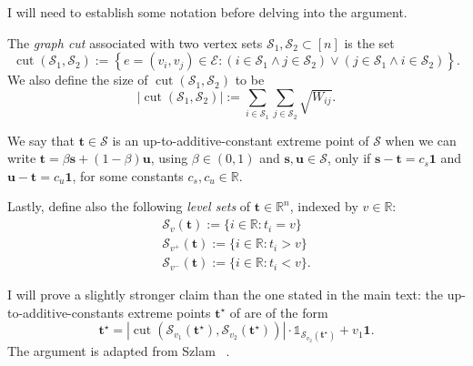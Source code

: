 I will need to establish some notation before delving into the argument.

\begin{definition}
    The \emph{graph cut} associated with two vertex sets $\mathcal{S}_1, \mathcal{S}_2 \subset [n]$ is the set
    \begin{equation}
        \operatorname{cut}\left(\mathcal{S}_1, \mathcal{S}_2\right) := \left\{ e = \left(v_i, v_j\right) \in \mathcal{E} : (i \in \mathcal{S}_1 \wedge j \in \mathcal{S}_2) \vee (j \in \mathcal{S}_1 \wedge i \in \mathcal{S}_2)\right\}.
    \end{equation}
    We also define the size of $\operatorname{cut}\left(\mathcal{S}_1, \mathcal{S}_2\right)$ to be
    \begin{equation}
        \left|\operatorname{cut}\left(\mathcal{S}_1, \mathcal{S}_2\right)\right| := \sum_{i \in \mathcal{S}_1} \sum_{j \in \mathcal{S}_2} \sqrt{W_{ij}}.
    \end{equation}
\end{definition}

\begin{definition}
    We say that $\mathbf{t} \in \mathcal{S}$ is an up-to-additive-constant extreme point of $\mathcal{S}$ when we can write $\mathbf{t} = \beta \mathbf{s} + (1 - \beta) \mathbf{u}$, using $\beta \in (0,1)$ and $\mathbf{s}, \mathbf{u} \in \mathcal{S}$, only if $\mathbf{s} - \mathbf{t} = c_s \mathbf{1}$ and $\mathbf{u} - \mathbf{t} = c_u \mathbf{1}$, for some constants $c_s, c_u \in \mathbb{R}$.
\end{definition}

Lastly, define also the following \emph{level sets} of $\mathbf{t} \in \mathbb{R}^{n}$, indexed by $v \in \mathbb{R}$:
\begin{align}
    \mathcal{S}_{v}(\mathbf{t}) := \{i \in \mathbb{R}: t_i = v\} \\
    \mathcal{S}_{v^{+}}(\mathbf{t}) := \{i \in \mathbb{R}: t_i > v\} \\
    \mathcal{S}_{v^{-}}(\mathbf{t}) := \{i \in \mathbb{R}: t_i < v\}.
    \end{align}

I will prove a slightly stronger claim than the one stated in the main text: the up-to-additive-constants extreme points $\mathbf{t}^\star$ of  are of the form
\begin{equation}
    \mathbf{t}^\star = |\operatorname{cut}(\mathcal{S}_{v_1}(\mathbf{t}^\star), \mathcal{S}_{v_2}(\mathbf{t}^\star))| \cdot \mathbb{1}_{\mathcal{S}_{v_2}(\mathbf{t}^\star)} + v_1 \mathbf{1}.
\end{equation}
The argument is adapted from Szlam \etal~\cite{szlam2010}.

